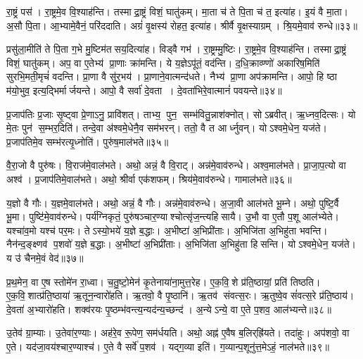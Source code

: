 रा॒ष्ट्रं पस॑।
रा॒ष्ट्रमे॒व वि॒श्याह॑न्ति।
तस्माद्रा॒ष्ट्रं विशं॒ घातु॑कम्।
मा॒ता च॑ ते पि॒ता च॑ त॒ इत्या॑ह।
इ॒यं वै मा॒ता।
अ॒सौ पि॒ता।
आ॒भ्यामे॒वैनं॒ परि॑ददाति।
अग्रं॑ वृ॒क्षस्य॑ रोहत॒ इत्या॑ह।
श्रीर्वै वृ॒क्षस्याग्रम्।
श्रि॒यमे॒वाव॑ रुन्धे॥३३॥

प्रसु॑ला॒मीति॑ ते पि॒ता ग॒भे मु॒ष्टिम॑तसय॒दित्या॑ह।
विड्वै गभ॑।
रा॒ष्ट्रम्मु॒ष्टिः।
रा॒ष्ट्रमे॒व वि॒श्याह॑न्ति।
तस्माद्रा॒ष्ट्रं विशं॒ घातु॑कम्।
अप॒ वा ए॒तेभ्य॑ प्रा॒णाः क्रा॑मन्ति।
ये य॒ज्ञेऽपू॑तं॒ वद॑न्ति।
द॒धि॒क्राव्ण्णो॑ अकारिष॒मिति॑ सुरभि॒मती॒मृचं॑ वदन्ति।
प्रा॒णा वै सु॑र॒भय॑।
प्रा॒णाने॒वात्मन्द॑धते।
नैभ्य॑ प्रा॒णा अप॑क्रामन्ति।
आपो॒ हि ष्ठा म॑यो॒भुव॒ इत्य॒द्भिर्मार्जयन्ते।
आपो॒ वै सर्वा॑ दे॒वता।
दे॒वता॑भिरे॒वात्मानं॑ पवयन्ते॥३४॥\anuvakamend[रा॒ष्ट्रस्य॒ मध्यं॒ पुष्य॑ति॒ गभो॑ रुन्धे दधते च॒त्वारि॑ च]

प्र॒जाप॑तिः प्र॒जाः सृ॒ष्ट्वा प्रे॒णाऽनु॒ प्रावि॑शत्।
ताभ्य॒ पुन॒ सम्भ॑वितु॒न्नाश॑क्नोत्।
सोऽब्रवीत्।
ऋ॒ध्नव॒दित्सः।
यो मे॒तः पुन॑ स॒म्भर॒दिति॑।
तन्दे॒वा अ॑श्वमे॒धेनै॒व सम॑भरन्।
ततो॒ वै त आर्ध्नुवन्।
योऽश्वमे॒धेन॒ यज॑ते।
प्र॒जाप॑तिमे॒व सम्भ॑रत्यृ॒ध्नोति॑।
पुरु॑ष॒माल॑भते॥३५॥

वै॒रा॒जो वै पुरु॑षः।
वि॒राज॑मे॒वाल॑भते।
अथो॒ अन्नं॒ वै वि॒राट्।
अन्न॑मे॒वाव॑रुन्धे।
अश्व॒माल॑भते।
प्रा॒जा॒प॒त्यो वा अश्व॑।
प्र॒जाप॑तिमे॒वाल॑भते।
अथो॒ श्रीर्वा एक॑शफम्।
श्रिय॑मे॒वाव॑रुन्धे।
गामाल॑भते॥३६॥

य॒ज्ञो वै गौः।
य॒ज्ञमे॒वाल॑भते।
अथो॒ अन्नं॒ वै गौः।
अन्न॑मे॒वाव॑रुन्धे।
अ॒जा॒वी आल॑भते भू॒म्ने।
अथो॒ पुष्टि॒र्वै भू॒मा।
पुष्टि॑मे॒वाव॑रुन्धे।
पर्य॑ग्निकृतं॒ पुरु॑षञ्चार॒ण्याश्चोत्सृ॑ज॒न्त्यहिसायै।
उ॒भौ वा ए॒तौ प॒शू आल॑भ्येते।
यश्चा॑व॒मो यश्च॑ पर॒मः।
तेऽस्यो॒भये॑ य॒ज्ञे ब॒द्धाः।
अ॒भीष्टा॑ अ॒भिप्री॑ताः।
अ॒भिजि॑ता अ॒भिहु॑ता भवन्ति।
नैन॑न्द॒ङ्क्ष्णव॑ प॒शवो॑ य॒ज्ञे ब॒द्धाः।
अ॒भीष्टा॑ अ॒भिप्री॑ताः।
अ॒भिजि॑ता अ॒भिहु॑ता हिसन्ति।
योऽश्वमे॒धेन॒ यज॑ते।
य उ॑ चैनमे॒वं वेद॑॥३७॥\anuvakamend[ल॒भ॒ते॒ गामाल॑भते पर॒मोऽष्टौ च॑]

प्र॒थ॒मेन॒ वा ए॒ष स्तोमे॑न रा॒ध्वा।
च॒तु॒ष्टो॒मेन॑ कृ॒तेनाया॑ना॒मुत्त॒रेह\sn{}।
ए॒क॒वि॒शे प्र॑ति॒ष्ठायां॒ प्रति॑ तिष्ठति।
ए॒क॒वि॒शात्प्र॑ति॒ष्ठाया॑ ऋ॒तून॒न्वारो॑हति।
ऋ॒तवो॒ वै पृ॒ष्ठानि॑।
ऋ॒तव॑ संवत्स॒रः।
ऋ॒तुष्वे॒व सं॑वत्स॒रे प्र॑ति॒ष्ठाय॑।
दे॒वता॑ अ॒भ्यारो॑हति।
शक्व॑रयः पृ॒ष्ठम्भ॑वन्त्य॒न्यद॑न्य॒च्छन्द॑।
अ॒न्येऽन्ये॒ वा ए॒ते प॒शव॒ आल॑भ्यन्ते॥३८॥

उ॒तेव॑ ग्रा॒म्याः।
उ॒तेवा॑र॒ण्याः।
अह॑रे॒व रू॒पेण॒ सम॑र्धयति।
अथो॒ अह्न॑ ए॒वैष ब॒लिर्‌ह्रि॑यते।
तदा॑हुः।
अप॑शवो॒ वा ए॒ते।
यद॑जा॒वय॑श्चार॒ण्याश्च॑।
ए॒ते वै सर्वे॑ प॒शव॑।
यद्ग॒व्या इति॑।
ग॒व्यान्प॒शूनु॑त्त॒मेऽहं॒ नाल॑भते॥३९॥

